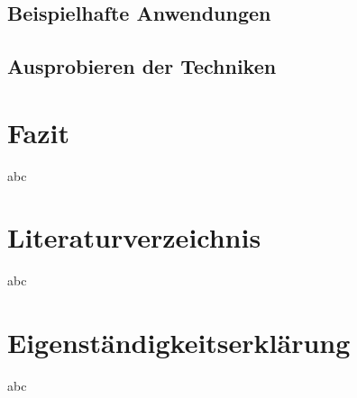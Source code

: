 \documentclass[a4paper,11pt]{scrartcl}
\begin{document}
\subsection{Beispielhafte Anwendungen}

\subsection{Ausprobieren der Techniken}

\section{Fazit}
abc

\section{Literaturverzeichnis}
abc

\section{Eigenständigkeitserklärung}
abc
\end{document}
